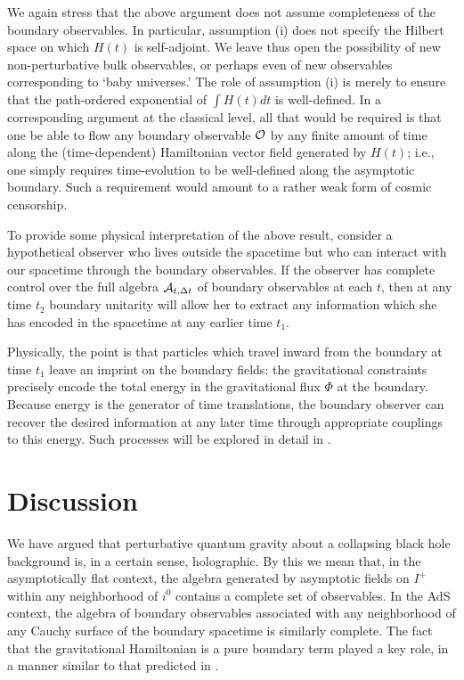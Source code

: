 \documentclass[12pt,onecolumn,eqsecnum,aps,prd,nofootinbib]{revtex4}
\begin{document}
We again stress that the above argument does not assume completeness of the boundary observables.  In particular, assumption (i) does not specify the Hilbert space on which $H(t)$ is self-adjoint.  We leave thus open the possibility of new non-perturbative bulk observables, or perhaps even of new observables corresponding to `baby universes.'  The role of assumption (i) is merely to ensure that the path-ordered exponential of $\int H(t) dt$ is well-defined.  In a corresponding argument at the classical level, all that would be required is that one be able to flow any boundary observable ${\cal O}$ by any finite amount of time along the (time-dependent) Hamiltonian vector field generated by $H(t)$; i.e., one simply requires time-evolution to be well-defined along the asymptotic boundary.  Such a requirement would amount to a rather weak form of cosmic censorship.

To provide some physical interpretation of the above result, consider a hypothetical observer who
lives outside the spacetime but who can interact with our spacetime
through the boundary observables.  If the observer has complete
control over the full algebra  ${\cal A}_{t, \Delta t}$ of boundary observables at each $t$, then at any time $t_2$ boundary unitarity will allow
her to extract any information which she has
encoded in the spacetime at any earlier time $t_1.$

Physically, the point is that particles which travel inward from the boundary at time $t_1$ leave an imprint on the boundary fields: the gravitational constraints precisely encode the total energy in the gravitational flux $\Phi$ at the boundary.  Because energy is the generator of time translations, the boundary observer can recover the desired information at any later time through appropriate couplings to this energy. Such processes will be explored in detail in \cite{soon}.

\section{Discussion}
\label{disc}

We have argued that perturbative quantum gravity about a collapsing
black hole background is, in a certain sense, holographic.  By this
we mean that, in the asymptotically flat context, the algebra
generated by asymptotic fields on $I^+$ within any neighborhood of
$i^0$ contains a complete set of observables. In the AdS context,
 the algebra of boundary observables associated with any
neighborhood of any Cauchy surface of the boundary spacetime is
similarly complete.  The fact that the gravitational Hamiltonian is
a pure boundary term played a key role, in a manner similar to that predicted in \cite{BMR}.
\end{document}
